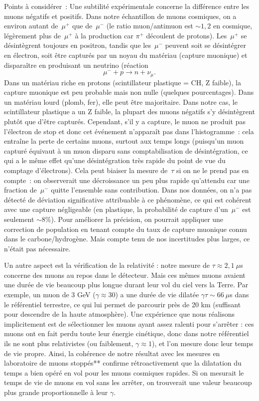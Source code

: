 \documentclass[a4paper,12pt,twoside]{article}
\begin{document}
Points à considérer~: Une subtilité expérimentale concerne la différence entre les muons négatifs et positifs. Dans notre échantillon de muons cosmiques, on a environ autant de~$\mu^+$ que de~$\mu^-$ (le ratio muon/antimuon est $\sim1{,}2$ en cosmique, légèrement plus de~$\mu^+$ à la production car $\pi^+$ découlent de protons). Les~$\mu^+$ se désintègrent toujours en positron, tandis que les~$\mu^-$ peuvent soit se désintégrer en électron, soit être capturés par un noyau du matériau (capture muonique) et disparaître en produisant un neutrino (réaction
\[
\mu^- + p \to n + \nu_\mu.
\]
Dans un matériau riche en protons (scintillateur plastique = CH, Z faible), la capture muonique est peu probable mais non nulle (quelques pourcentages). Dans un matériau lourd (plomb, fer), elle peut être majoritaire. Dans notre cas, le scintillateur plastique a un Z faible, la plupart des muons négatifs s'y désintègrent plutôt que d'être capturés. Cependant, s'il y a capture, le muon ne produit pas l'électron de stop et donc cet événement n'apparaît pas dans l'histogramme~: cela entraîne la perte de certains muons, surtout aux temps longs (puisqu'un muon capturé équivaut à un muon \og disparu\fg{} sans comptabilisation de désintégration, ce qui a le même effet qu'une désintégration très rapide du point de vue du comptage d'électrons). Cela peut biaiser la mesure de~$\tau$ si on ne le prend pas en compte~: on observerait une décroissance un peu plus rapide qu'attendu car une fraction de~$\mu^-$ \og quitte\fg{} l'ensemble sans contribution. Dans nos données, on n'a pas détecté de déviation significative attribuable à ce phénomène, ce qui est cohérent avec une capture négligeable (en plastique, la probabilité de capture d'un~$\mu^-$ est seulement $\sim8\%$). Pour améliorer la précision, on pourrait appliquer une correction de population en tenant compte du taux de capture muonique connu dans le carbone/hydrogène. Mais compte tenu de nos incertitudes plus larges, ce n'était pas nécessaire.

Un autre aspect est la vérification de la relativité : notre mesure de $\tau \approx 2,1~\mu$s concerne des muons au repos dans le détecteur. Mais ces mêmes muons avaient une durée de vie beaucoup plus longue durant leur vol du ciel vers la Terre. Par exemple, un muon de 3 GeV ($\gamma \approx 30$) a une durée de vie dilatée $\gamma \tau \sim 66~\mu$s dans le référentiel terrestre, ce qui lui permet de parcourir près de 20 km (suffisant pour descendre de la haute atmosphère). Une expérience que nous réalisons implicitement est de sélectionner les muons ayant assez ralenti pour s’arrêter : ces muons ont en fait perdu toute leur énergie cinétique, donc dans notre référentiel ils ne sont plus relativistes (ou faiblement, $\gamma \approx 1$), et l’on mesure donc leur temps de vie propre. Ainsi, la cohérence de notre résultat avec les mesures en laboratoire de muons stoppés** confirme rétroactivement que la dilatation du temps a bien opéré en vol pour les muons cosmiques rapides. Si on mesurait le temps de vie de muons en vol sans les arrêter, on trouverait une valeur beaucoup plus grande proportionnelle à leur $\gamma$.
\end{document}
